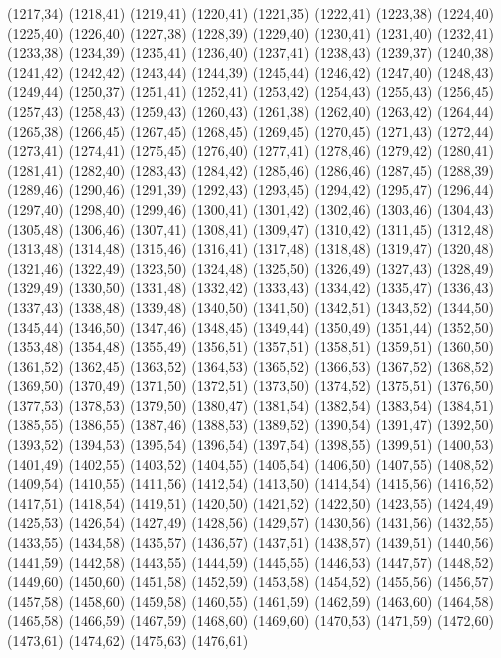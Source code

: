 (1217,34)
(1218,41)
(1219,41)
(1220,41)
(1221,35)
(1222,41)
(1223,38)
(1224,40)
(1225,40)
(1226,40)
(1227,38)
(1228,39)
(1229,40)
(1230,41)
(1231,40)
(1232,41)
(1233,38)
(1234,39)
(1235,41)
(1236,40)
(1237,41)
(1238,43)
(1239,37)
(1240,38)
(1241,42)
(1242,42)
(1243,44)
(1244,39)
(1245,44)
(1246,42)
(1247,40)
(1248,43)
(1249,44)
(1250,37)
(1251,41)
(1252,41)
(1253,42)
(1254,43)
(1255,43)
(1256,45)
(1257,43)
(1258,43)
(1259,43)
(1260,43)
(1261,38)
(1262,40)
(1263,42)
(1264,44)
(1265,38)
(1266,45)
(1267,45)
(1268,45)
(1269,45)
(1270,45)
(1271,43)
(1272,44)
(1273,41)
(1274,41)
(1275,45)
(1276,40)
(1277,41)
(1278,46)
(1279,42)
(1280,41)
(1281,41)
(1282,40)
(1283,43)
(1284,42)
(1285,46)
(1286,46)
(1287,45)
(1288,39)
(1289,46)
(1290,46)
(1291,39)
(1292,43)
(1293,45)
(1294,42)
(1295,47)
(1296,44)
(1297,40)
(1298,40)
(1299,46)
(1300,41)
(1301,42)
(1302,46)
(1303,46)
(1304,43)
(1305,48)
(1306,46)
(1307,41)
(1308,41)
(1309,47)
(1310,42)
(1311,45)
(1312,48)
(1313,48)
(1314,48)
(1315,46)
(1316,41)
(1317,48)
(1318,48)
(1319,47)
(1320,48)
(1321,46)
(1322,49)
(1323,50)
(1324,48)
(1325,50)
(1326,49)
(1327,43)
(1328,49)
(1329,49)
(1330,50)
(1331,48)
(1332,42)
(1333,43)
(1334,42)
(1335,47)
(1336,43)
(1337,43)
(1338,48)
(1339,48)
(1340,50)
(1341,50)
(1342,51)
(1343,52)
(1344,50)
(1345,44)
(1346,50)
(1347,46)
(1348,45)
(1349,44)
(1350,49)
(1351,44)
(1352,50)
(1353,48)
(1354,48)
(1355,49)
(1356,51)
(1357,51)
(1358,51)
(1359,51)
(1360,50)
(1361,52)
(1362,45)
(1363,52)
(1364,53)
(1365,52)
(1366,53)
(1367,52)
(1368,52)
(1369,50)
(1370,49)
(1371,50)
(1372,51)
(1373,50)
(1374,52)
(1375,51)
(1376,50)
(1377,53)
(1378,53)
(1379,50)
(1380,47)
(1381,54)
(1382,54)
(1383,54)
(1384,51)
(1385,55)
(1386,55)
(1387,46)
(1388,53)
(1389,52)
(1390,54)
(1391,47)
(1392,50)
(1393,52)
(1394,53)
(1395,54)
(1396,54)
(1397,54)
(1398,55)
(1399,51)
(1400,53)
(1401,49)
(1402,55)
(1403,52)
(1404,55)
(1405,54)
(1406,50)
(1407,55)
(1408,52)
(1409,54)
(1410,55)
(1411,56)
(1412,54)
(1413,50)
(1414,54)
(1415,56)
(1416,52)
(1417,51)
(1418,54)
(1419,51)
(1420,50)
(1421,52)
(1422,50)
(1423,55)
(1424,49)
(1425,53)
(1426,54)
(1427,49)
(1428,56)
(1429,57)
(1430,56)
(1431,56)
(1432,55)
(1433,55)
(1434,58)
(1435,57)
(1436,57)
(1437,51)
(1438,57)
(1439,51)
(1440,56)
(1441,59)
(1442,58)
(1443,55)
(1444,59)
(1445,55)
(1446,53)
(1447,57)
(1448,52)
(1449,60)
(1450,60)
(1451,58)
(1452,59)
(1453,58)
(1454,52)
(1455,56)
(1456,57)
(1457,58)
(1458,60)
(1459,58)
(1460,55)
(1461,59)
(1462,59)
(1463,60)
(1464,58)
(1465,58)
(1466,59)
(1467,59)
(1468,60)
(1469,60)
(1470,53)
(1471,59)
(1472,60)
(1473,61)
(1474,62)
(1475,63)
(1476,61)
